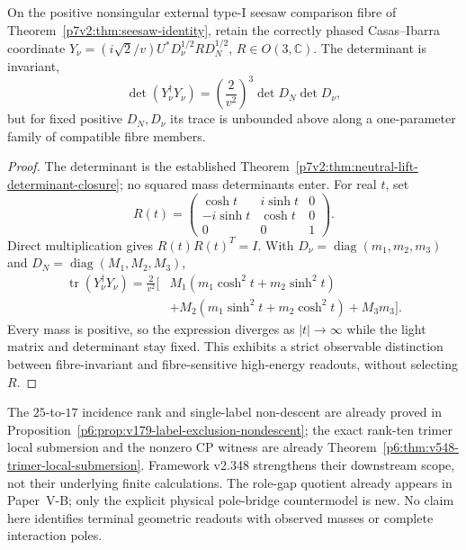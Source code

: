 \documentclass[11pt,a4paper]{article}
\begin{document}
\begin{proposition}
\label{p5d:prop:v348-casas-trace-unbounded}
On the positive nonsingular external type-I seesaw comparison fibre
of Theorem~\ref{p7v2:thm:seesaw-identity}, retain the correctly
phased Casas--Ibarra coordinate
$Y_\nu=(i\sqrt2/v)U^*D_\nu^{1/2}RD_N^{1/2}$,
$R\in O(3,\mathbb C)$.  The determinant is invariant,
\[
 \det(Y_\nu^\dagger Y_\nu)
 =\left(\frac2{v^2}\right)^3\det D_N\det D_\nu,
\]
but for fixed positive $D_N,D_\nu$ its trace is unbounded above
along a one-parameter family of compatible fibre members.
\end{proposition}
\begin{proof}
The determinant is the established
Theorem~\ref{p7v2:thm:neutral-lift-determinant-closure}; no squared
mass determinants enter.  For real $t$, set
\[
 R(t)=\begin{pmatrix}
 \cosh t&i\sinh t&0\\
 -i\sinh t&\cosh t&0\\
 0&0&1
 \end{pmatrix}.
\]
Direct multiplication gives $R(t)R(t)^T=I$.  With
$D_\nu=\operatorname{diag}(m_1,m_2,m_3)$ and
$D_N=\operatorname{diag}(M_1,M_2,M_3)$,
\[
 \begin{split}
 \operatorname{tr}(Y_\nu^\dagger Y_\nu)
 =\frac2{v^2}\bigl[&M_1(m_1\cosh^2t+m_2\sinh^2t)\\
 &+M_2(m_1\sinh^2t+m_2\cosh^2t)+M_3m_3\bigr].
 \end{split}
\]
Every mass is positive, so the expression diverges as
$|t|\to\infty$ while the light matrix and determinant stay fixed.
This exhibits a strict observable distinction between fibre-invariant
and fibre-sensitive high-energy readouts, without selecting $R$.
\end{proof}

\begin{remark}
\label{p5d:rem:v348-existing-certificate-ownership}
The $25$-to-$17$ incidence rank and single-label non-descent are
already proved in Proposition~\ref{p6:prop:v179-label-exclusion-nondescent};
the exact rank-ten trimer local submersion and the nonzero CP witness
are already Theorem~\ref{p6:thm:v548-trimer-local-submersion}.
Framework v2.348 strengthens their downstream scope, not their
underlying finite calculations.  The role-gap quotient already appears
in Paper~V-B; only the explicit physical pole-bridge countermodel is
new.  No claim here identifies terminal geometric readouts with
observed masses or complete interaction poles.
\end{remark}
\end{document}
